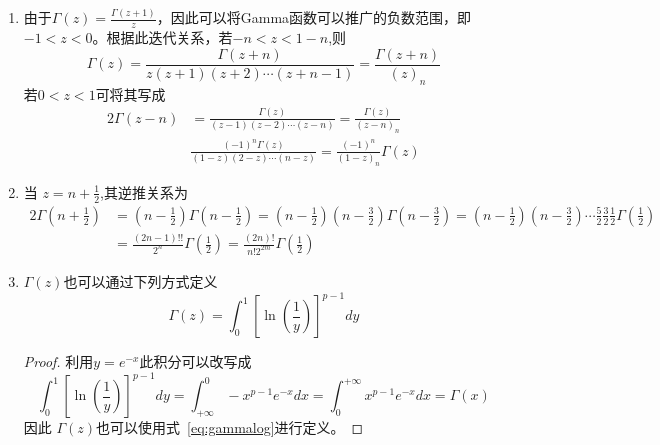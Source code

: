 \begin{property}
\begin{enumerate}[noitemsep]
		\item 由于$\displaystyle \Gamma\left(z\right)=\frac{\Gamma\left(z+1\right)}{z}$，因此可以将Gamma函数可以推广的负数范围，即$-1<z<0$。根据此迭代关系，若$-n<z<1-n$,则
		$$\Gamma\left(z\right) = \frac{\Gamma\left(z+n\right)}{z\left(z+1\right)\left(z+2\right)\cdots\left(z+n-1\right)}=\frac{\Gamma\left(z+n\right)}{\left(z\right)_n}$$
		若$0<z<1$可将其写成
		\begin{alignat*}{2}
		\Gamma\left(z-n\right) & = \frac{\Gamma\left(z\right)}{\left(z-1\right)\left(z-2\right)\cdots\left(z-n\right)} = \frac{\Gamma\left(z\right)}{\left(z-n\right)_n}\\
		& \frac{\left(-1\right)^n\Gamma\left(z\right)}{\left(1-z\right)\left(2-z\right)\cdots\left(n-z\right)}= \frac{\left(-1\right)^n}{\left(1-z\right)_n}\Gamma\left(z\right)
		\end{alignat*}
		
		\item 当 $\displaystyle z = n+\frac{1}{2}$,其逆推关系为
		\begin{alignat*}{2}
		\Gamma \left(n+\frac{1}{2} \right) & = \left(n-\frac{1}{2}\right)\Gamma\left(n-\frac{1}{2}\right) = \left(n-\frac{1}{2}\right)\left(n-\frac{3}{2}\right)\Gamma\left(n-\frac{3}{2}\right) = \left(n-\frac{1}{2}\right)\left(n-\frac{3}{2}\right)\cdots \frac{5}{2}\frac{3}{2}\frac{1}{2}\Gamma \left(\frac{1}{2} \right)\\
		& = \frac{\left(2n-1\right)!!}{2^n}\Gamma\left(\frac{1}{2}\right) = \frac{\left(2n\right)!}{n!2^{2m}}\Gamma\left(\frac{1}{2}\right)
		\end{alignat*}
		
		\item $\Gamma\left(z\right)$也可以通过下列方式定义
		\begin{equation}\label{eq:gammalog}
		\Gamma\left(z\right) = \int_{0}^{1}\left[\ln \left(\frac{1}{y} \right) \right]^{p-1}dy
		\end{equation}
		\begin{proof}	
			利用$y = e^{-x}$此积分可以改写成
			$$\int_{0}^{1}\left[\ln \left(\frac{1}{y} \right) \right]^{p-1}dy = \int_{+\infty}^{0}-x^{p-1}e^{-x}dx =  \int_{0}^{+\infty}x^{p-1}e^{-x}dx = \Gamma\left(x\right)$$
			因此 $\Gamma\left(z\right)$也可以使用式~\ref{eq:gammalog}进行定义。
		\end{proof}	
		

\end{enumerate}
\end{property}
